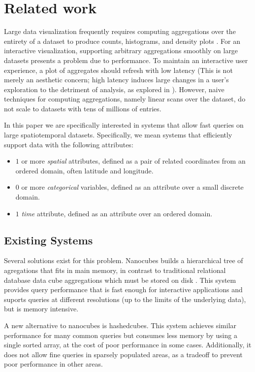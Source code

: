 \documentclass[journal]{vgtc}                %
\begin{document}
\section{Related work}

Large data visualization frequently requires computing aggregations over the
entirety of a dataset to produce counts, histograms, and density plots
\cite{?}. For an interactive visualization, supporting arbitrary aggregations
smoothly on large datasets presents a problem due to performance. To maintain
an interactive user experience, a plot of aggregates should refresh with low
latency (This is not merely an aesthetic concern; high latency induces large
changes in a user's exploration to the detriment of analysis, as explored in
\cite{2014-latency} ). However, naive techniques
for computing aggregations, namely linear scans over the dataset, do not scale
to datasets with tens of millions of entries.

In this paper we are specifically interested in systems that allow fast queries on large spatiotemporal datasets. Specifically, we mean systems that efficiently support data with the following attributes:

\begin{itemize}
	\item $1$ or more \textit{spatial} attributes, defined as a pair of related coordinates from an ordered domain, often latitude and longitude.
	\item $0$ or more \textit{categorical} variables, defined as an attribute over a small discrete domain.
	\item $1$ \textit{time} attribute, defined as an attribute over an ordered domain.
\end{itemize}

\subsection{Existing Systems}

Several solutions exist for this problem. Nanocubes builds a
hierarchical tree of agregations that fits in main memory, in contrast to
traditional relational database data cube aggregations which must be stored on
disk \cite{nanocubes}. This system provides query performance that is fast
enough for interactive applications and suports queries at different
resolutions (up to the limits of the underlying data), but is memory intensive.

A new alternative to nanocubes is hashedcubes. This system
achieves similar performance for many common queries but consumes less memory
by using a single sorted array, at the cost of poor performance in some cases.
Additionally, it does not allow fine queries in sparsely populated areas, as a
tradeoff to prevent poor performance in other areas.
\end{document}
